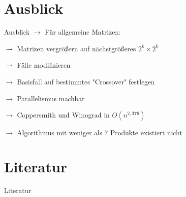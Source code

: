 \documentclass[aspectratio=169]{beamer}
\begin{document}
\section{Ausblick}
\begin{frame}{Ausblick}
    $\rightarrow$ Für allgemeine Matrizen:
    
    \qquad $\rightharpoonup$ Matrizen vergrößern auf nächstgrößeres $2^k \times 2^k$
    
    \qquad $\rightharpoonup$ Fälle modifizieren
    
    \bigskip
    $\rightarrow$ Basisfall auf bestimmtes "Crossover" festlegen
    
    \bigskip
    $\rightarrow$ Parallelismus machbar
    
    \bigskip
    $\rightarrow$ Coppersmith und Winograd in $O(n^{2,376})$ \cite{10.5555/1614191}
    
    \bigskip
    $\rightarrow$ Algorithmus mit weniger als 7 Produkte existiert nicht \cite{https://doi.org/10.48550/arxiv.math/0407224}
\end{frame}

\section{Literatur}
\begin{frame}{Literatur}
    \nocite{*}
    
    
\end{frame}
\end{document}
